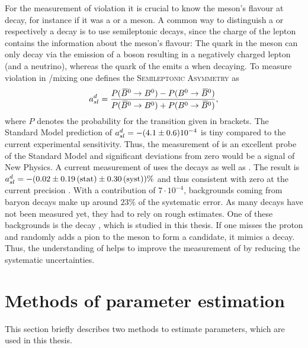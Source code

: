For the measurement of \CP violation it is crucial to know the meson's flavour at decay, for instance if it was a \Bd or a \Bdb meson.
A common way to distinguish a \Bd or respectively a \Bdb decay is to use semileptonic decays, since the charge of the lepton contains the information about the meson's flavour:
The \bquark quark in the \Bd meson can only decay via the emission of a \Wm boson resulting in a negatively charged lepton (and a neutrino), whereas the \bquarkbar quark of the \Bdb emits a \Wp when decaying.
To measure \CP violation in \Bd/\Bdb mixing one defines the \textsc{Semileptonic Asymmetry} \asld as
\begin{align}
    a_{sl}^d = \frac{P({{\kern 0.18em\overline{\kern -0.18em B}{}}{}^0} \rightarrow {\ensuremath{{B}^0}}) - P({{B}^0} \rightarrow {\ensuremath{{\kern 0.18em\overline{\kern -0.18em B}{}}{}^0}})}{P({{\kern 0.18em\overline{\kern -0.18em B}{}}{}^0} \rightarrow {\ensuremath{{B}^0}}) + P({{B}^0} \rightarrow {\ensuremath{{\kern 0.18em\overline{\kern -0.18em B}{}}{}^0}})},
\end{align}
where $P$ denotes the probability for the transition given in brackets.
The Standard Model prediction of $a_{sl}^d = -(4.1 \pm 0.6) 10^{-4}$ \cite{asld_SM} is tiny compared to the current experimental sensitivity.
Thus, the measurement of \asld is an excellent probe of the Standard Model and significant deviations from zero would be a signal of New Physics.
A current \lhcb measurement of \asld uses the decays  as well as .
The result is $a_{sl}^d = -(0.02 \pm 0.19\mathrm{\,(stat)} \pm 0.30\mathrm{\,(syst)})\%$ and thus consistent with zero at the current precision \cite{asld_LHCb}.
With a contribution of $7\cdot 10^{-4}$, backgrounds coming from \Lb baryon decays make up around $23\%$ of the systematic error. As many \Lb decays have not been measured yet, they had to rely on rough estimates.
One of these backgrounds is the decay \LbToDpmunuX, which is studied in this thesis.
If one misses the proton and randomly adds a pion to the \Dz meson to form a \Dstar candidate, it mimics a  decay.
Thus, the understanding of \LbToDpmunuX helps to improve the measurement of \asld by reducing the systematic uncertainties.

\section{Methods of parameter estimation}
This section briefly describes two methods to estimate parameters, which are used in this thesis.

